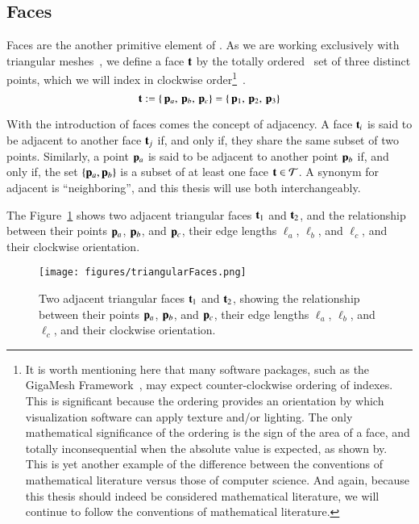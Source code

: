 \subsection{Faces}
\label{ch2s3ssF}
Faces are the another primitive element of \tdd{}. As we are working exclusively with triangular meshes~\cite[p.~26]{Mara12}, we define a face $\mathbf{t}$ by the totally ordered~\cite{Weisstein19a} set of three distinct points, which we will index in clockwise order\footnote{It is worth mentioning here that many software packages, such as the GigaMesh Framework~\cite[p.~89]{Mara12}, may expect counter-clockwise ordering of indexes. This is significant because the ordering provides an orientation by which visualization software can apply texture and/or lighting. The only mathematical significance of the ordering is the sign of the area of a face, and totally inconsequential when the absolute value is expected, as shown by\cite[p.~2]{Braden86}. This is yet another example of the difference between the conventions of mathematical literature versus those of computer science. And again, because this thesis should indeed be considered mathematical literature, we will continue to follow the conventions of mathematical literature.}~\cite[p.~4]{Mara17}.
%
\begin{equation}
	\mathbf{t} := \left \{\,\mathbf{p}_a,\,\mathbf{p}_b,\,\mathbf{p}_c\right \} = \left \{\,\mathbf{p}_1,\,\mathbf{p}_2,\,\mathbf{p}_3\right \}
	\label{eq:defineFaces}
\end{equation}

With the introduction of faces comes the concept of adjacency. A face $\mathbf{t}_i$ is said to be adjacent to another face $\mathbf{t}_j$ if, and only if, they share the same subset of two points. Similarly, a point $\mathbf{p}_a$ is said to be adjacent to another point $\mathbf{p}_b$ if, and only if, the set $\{\mathbf{p}_a, \mathbf{p}_b\}$ is a subset of at least one face $\mathbf{t} \in \mathcal{T}$. A synonym for adjacent is ``neighboring'', and this thesis will use both interchangeably. 

The Figure~\ref{fig:triangularFaces} shows two adjacent triangular faces $\mathbf{t}_1$ and $\mathbf{t}_2$, and the relationship between their points $\mathbf{p}_a$, $\mathbf{p}_b$, and $\mathbf{p}_c$, their edge lengths $\ell_a$, $\ell_b$, and $\ell_c$, and their clockwise orientation.

\begin{figure}
\ffigbox
	{\texttt{[image: figures/triangularFaces.png]}}
	{\caption[Two Triangular Faces]{Two adjacent triangular faces $\mathbf{t}_1$ and $\mathbf{t}_2$, showing the relationship between their points $\mathbf{p}_a$, $\mathbf{p}_b$, and $\mathbf{p}_c$, their edge lengths $\ell_a$, $\ell_b$, and $\ell_c$, and their clockwise orientation.}\label{fig:triangularFaces}}
\end{figure}

